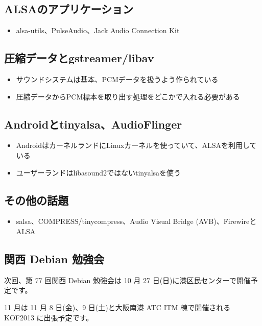 \documentclass[mingoth,a4paper]{jsarticle}
\begin{document}
\subsection{ALSAのアプリケーション}
\begin{itemize}
\item alsa-utils、PulseAudio、Jack Audio Connection Kit
\end{itemize}

\subsection{圧縮データとgstreamer/libav}
\begin{itemize}
\item サウンドシステムは基本、PCMデータを扱うよう作られている
\item 圧縮データからPCM標本を取り出す処理をどこかで入れる必要がある
\end{itemize}

\subsection{Androidとtinyalsa、AudioFlinger}
\begin{itemize}
\item AndroidはカーネルランドにLinuxカーネルを使っていて、ALSAを利用している
\item ユーザーランドはlibasound2ではないtinyalsaを使う
\end{itemize}

\subsection{その他の話題}
\begin{itemize}
\item salsa、COMPRESS/tinycompress、Audio Visual Bridge (AVB)、FirewireとALSA
\end{itemize}




\subsection{関西 Debian 勉強会}

次回、第 77 回関西 Debian 勉強会は 10 月 27 日(日)に港区民センターで開催予定です。

11 月は 11 月 8 日(金)、9 日(土)と大阪南港 ATC ITM 棟で開催される KOF2013 に出張予定です。
\end{document}
